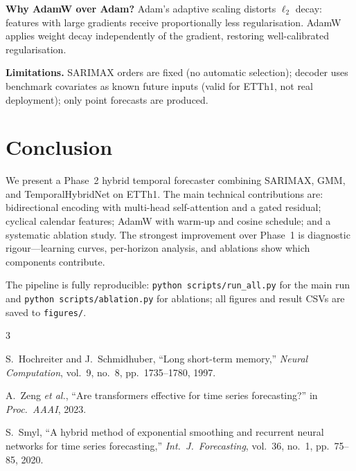 \documentclass[10pt,a4paper,twocolumn]{article}
\begin{document}
\textbf{Why AdamW over Adam?}
Adam's adaptive scaling distorts $\ell_2$ decay: features with large
gradients receive proportionally less regularisation.
AdamW applies weight decay independently of the gradient, restoring
well-calibrated regularisation.

\textbf{Limitations.}
SARIMAX orders are fixed (no automatic selection); decoder uses benchmark
covariates as known future inputs (valid for ETTh1, not real deployment);
only point forecasts are produced.

\section{Conclusion}

We present a Phase~2 hybrid temporal forecaster combining SARIMAX, GMM, and
TemporalHybridNet on ETTh1.
The main technical contributions are: bidirectional encoding with multi-head
self-attention and a gated residual; cyclical calendar features; AdamW with
warm-up and cosine schedule; and a systematic ablation study.
The strongest improvement over Phase~1 is diagnostic rigour---learning curves,
per-horizon analysis, and ablations show which components contribute.

The pipeline is fully reproducible:
\texttt{python scripts/run\_all.py} for the main run and
\texttt{python scripts/ablation.py} for ablations;
all figures and result CSVs are saved to \texttt{figures/}.


\begin{thebibliography}{3}

S.~Hochreiter and J.~Schmidhuber,
``Long short-term memory,''
\textit{Neural Computation}, vol.~9, no.~8, pp.~1735--1780, 1997.

A.~Zeng \textit{et al.},
``Are transformers effective for time series forecasting?''
in \textit{Proc.\ AAAI}, 2023.

S.~Smyl,
``A hybrid method of exponential smoothing and recurrent neural networks
for time series forecasting,''
\textit{Int.\ J.\ Forecasting}, vol.~36, no.~1, pp.~75--85, 2020.

\end{thebibliography}
\end{document}
